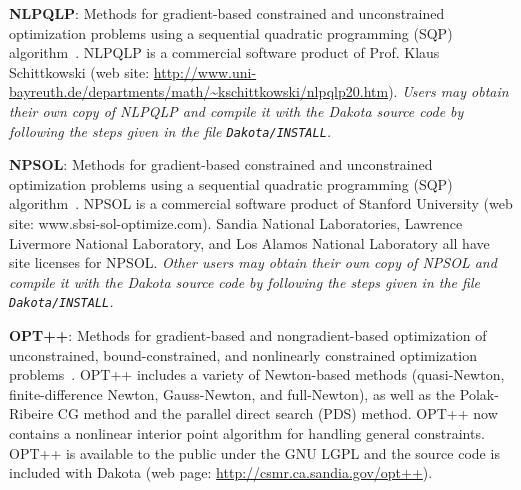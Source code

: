 \textbf{NLPQLP}: Methods for gradient-based constrained and
unconstrained optimization problems using a sequential quadratic
programming (SQP) algorithm~\cite{Sch04}.  NLPQLP is a commercial
software product of Prof. Klaus Schittkowski (web site:
\url{http://www.uni-bayreuth.de/departments/math/~kschittkowski/nlpqlp20.htm}).
\emph{Users may obtain their own copy of NLPQLP and compile it with the
Dakota source code by following the steps given in the file {\tt Dakota/INSTALL}.}

\textbf{NPSOL}: Methods for gradient-based constrained and
unconstrained optimization problems using a sequential quadratic
programming (SQP) algorithm~\cite{Gil86}. NPSOL is a commercial software
product of Stanford University (web site: www.sbsi-sol-optimize.com).
Sandia National Laboratories, Lawrence Livermore National Laboratory,
and Los Alamos National Laboratory all have site licenses for NPSOL.
\emph{Other users may obtain their own copy of NPSOL and compile it
with the Dakota source code by following the steps given in the file
{\tt Dakota/INSTALL}.}

\textbf{OPT++}: Methods for gradient-based and nongradient-based
optimization of unconstrained, bound-constrained, and nonlinearly
constrained optimization problems~\cite{MeOlHoWi07}. OPT++ includes a
variety of Newton-based methods (quasi-Newton, finite-difference
Newton, Gauss-Newton, and full-Newton), as well as the Polak-Ribeire
CG method and the parallel direct search (PDS) method. OPT++ now
contains a nonlinear interior point algorithm for handling general
constraints.  OPT++ is available to the public under the GNU LGPL and
the source code is included with Dakota (web page:
\url{http://csmr.ca.sandia.gov/opt++}).



